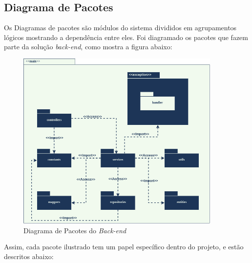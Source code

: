 \subsection{Diagrama de Pacotes}

Os Diagramas de pacotes são módulos do sistema divididos em agrupamentos lógicos mostrando a dependência entre eles.
Foi diagramado os pacotes que fazem parte da solução \emph{back-end}, como mostra a figura abaixo:

\begin{figure}[H]
    \centering
    \includegraphics[width=0.9\textwidth]{figuras/software/diagrama-pacote.png}
    \caption{Diagrama de Pacotes do \emph{Back-end}}
    \label{fig:pacotes-diagrama}
\end{figure}

Assim, cada pacote ilustrado tem um papel específico dentro do projeto, e estão descritos abaixo:

